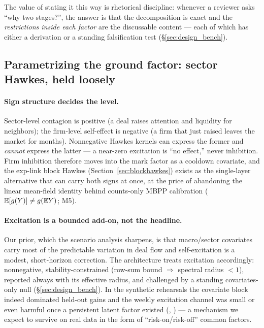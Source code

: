The value of stating it this way is rhetorical discipline: whenever a reviewer
asks ``why two stages?'', the answer is that the decomposition is exact and the
\emph{restrictions inside each factor} are the discussable content --- each of
which has either a derivation or a standing falsification test
(\S\ref{sec:design_bench}).

\subsection{Parametrizing the ground factor: sector Hawkes, held loosely}
\label{sec:design_ground}

\paragraph{Sign structure decides the level.} Sector-level contagion is
positive (a deal raises attention and liquidity for neighbors); the firm-level
self-effect is negative (a firm that just raised leaves the market for months).
Nonnegative Hawkes kernels can express the former and \emph{cannot} express the
latter --- a near-zero excitation is ``no effect,'' never inhibition. Firm
inhibition therefore moves into the mark factor as a cooldown covariate, and
the exp-link block Hawkes (Section~\ref{sec:blockhawkes}) exists as the
single-layer alternative that can carry both signs at once, at the price of
abandoning the linear mean-field identity behind counts-only MBPP calibration
($\mathbb{E}[g(Y)]\neq g(\mathbb{E} Y)$; M5).

\paragraph{Excitation is a bounded add-on, not the headline.} Our prior, which
the scenario analysis sharpens, is that macro/sector covariates carry most of
the predictable variation in deal flow and self-excitation is a modest,
short-horizon correction. The architecture treats excitation accordingly:
nonnegative, stability-constrained (row-sum bound $\Rightarrow$ spectral radius
$<1$), reported always with its effective radius, and challenged by a standing
covariates-only null (\S\ref{sec:design_bench}). In the synthetic rehearsals
the covariate block indeed dominated held-out gains and the weekly excitation
channel was small or even harmful once a persistent latent factor existed
(, ) --- a mechanism we expect to survive on real data
in the form of ``risk-on/risk-off'' common factors.

